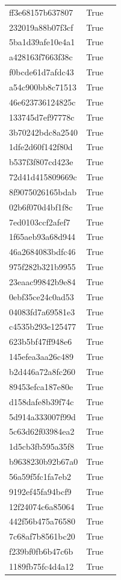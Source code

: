\begin{tabular}{lrl}
ff3e68157b637807 & True &  \\
232019a88b07f3cf & True &  \\
5ba1d39afe10e4a1 & True &  \\
a428163f7663f38c & True &  \\
f0bcde61d7afdc43 & True &  \\
a54c900bb8c71513 & True &  \\
46e623736124825c & True &  \\
133745d7ef97778c & True &  \\
3b70242bdc8a2540 & True &  \\
1dfe2d60f142f80d & True &  \\
b537f3f807cd423e & True &  \\
72d41d415809669c & True &  \\
8f9075026165bdab & True &  \\
02b6f070d4bf1f8c & True &  \\
7ed0103ccf2afef7 & True &  \\
1f65aeb93a68d944 & True &  \\
46a2684083bdfc46 & True &  \\
975f282b321b9955 & True &  \\
23eaac99842b9e84 & True &  \\
0ebf35ce24c0ad53 & True &  \\
04083fd7a69581e3 & True &  \\
c4535b293e125477 & True &  \\
623b5bf47ff948e6 & True &  \\
145efea3aa26c489 & True &  \\
b2d446a72a8fc260 & True &  \\
89453efca187e80e & True &  \\
d158dafe8b39f74c & True &  \\
5d914a333007f99d & True &  \\
5c63d62f03984ea2 & True &  \\
1d5cb3fb595a35f8 & True &  \\
b9638230b92b67a0 & True &  \\
56a59f5fc1fa7eb2 & True &  \\
9192ef45fa94bcf9 & True &  \\
12f24074c6a85064 & True &  \\
442f56b475a76580 & True &  \\
7c68af7b8561bc20 & True &  \\
f239bf0fb6b47c6b & True &  \\
1189fb75fc4d4a12 & True &  \\

\end{tabular}
